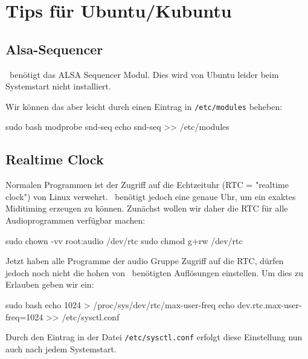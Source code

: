   \section{Tips für Ubuntu/Kubuntu}

    \subsection{Alsa-Sequencer}

      \M\ benötigt das ALSA Sequencer Modul. Dies wird von Ubuntu leider
      beim Systemstart nicht installiert.

      Wir können das aber leicht durch einen Eintrag in {\tt /etc/modules}
      beheben:

      \starttyping
            sudo bash
            modprobe snd-seq
            echo snd-seq >> /etc/modules
      \stoptyping


    \subsection{Realtime Clock}

      Normalen Programmen ist der Zugriff auf die Echtzeituhr 
      (RTC = "realtime clock") von Linux
      verwehrt. \M\ benötigt jedoch eine genaue Uhr, um ein exaktes
      Miditiming erzeugen zu können.
      Zunächst wollen wir daher die RTC für alle Audioprogrammen
      verfügbar machen:

      \starttyping
            sudo chown -vv root:audio /dev/rtc
            sudo chmod g+rw /dev/rtc
      \stoptyping

      Jetzt haben alle Programme der audio Gruppe Zugriff auf die
      RTC, dürfen jedoch noch nicht die hohen von \M\ benötigten
      Auflösungen einstellen.
      Um dies zu Erlauben geben wir ein:

      
      \starttyping
            sudo bash
            echo 1024 > /proc/sys/dev/rtc/max-user-freq
            echo dev.rtc.max-user-freq=1024 >> /etc/sysctl.conf
      \stoptyping

      Durch den Eintrag in der Datei {\tt /etc/sysctl.conf} erfolgt diese
      Einstellung nun auch nach jedem Systemstart.
